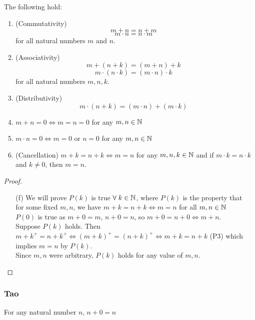\documentclass[12pt]{article}
\begin{document}
\begin{thm} \label{thm:properties}
    The following hold:
    \begin{enumerate}[label=(\alph*)]
        \item\label{thm:comm} (Commutativity)
        \[
            m + n = n + m
        \]
        \[
            m \cdot n = n \cdot m
        \]
        for all natural numbers $m$ and $n$.

        \item\label{thm:asso} (Associativity)
        \[
            m + (n + k) = (m + n) + k
        \] \[
            m \cdot (n \cdot k) = (m \cdot n) \cdot k
        \]
        for all natural numbers $m, n, k$.

        \item\label{thm:dist} (Distributivity)
        \[
            m \cdot (n + k) = (m \cdot n) + (m \cdot k)
        \]
        
        \item\label{thm:m+n=0} $m + n = 0 \iff m = n = 0$ for any $m, n \in \mathbb{N}$

        \item $m \cdot n = 0 \iff m = 0$ or $n = 0$ for any $m, n \in \mathbb{N}$

        \item (Cancellation) $m + k = n + k \iff m = n$ for any $m, n, k \in \mathbb{N}$ and if $m \cdot k = n \cdot k$ and $k \neq 0$, then $m = n$.
    \end{enumerate}
\end{thm}

\begin{proof}
    \begin{enumerate}[label=(\alph*)]
        \item[(f)] We will prove $P(k)$ is true $\forall\; k \in \mathbb{N}$, where $P(k)$ is the property that for some fixed $m, n$, we have $m + k = n + k \iff m = n$ for all $m, n \in \mathbb{N}$ \\
        $P(0)$ is true as $m + 0 = m$, $n + 0 = n$, so $m + 0 = n + 0 \iff m + n$. \\
        Suppose $P(k)$ holds. Then $m + k^{+} = n + k^{+} \iff (m + k)^{+} = (n + k)^{+} \iff m + k = n + k$ (P3) which implies $m = n$ by $P(k)$. \\
        Since $m, n$ were arbitrary, $P(k)$ holds for any value of $m, n$.
    \end{enumerate}
\end{proof}

\subsubsection{Tao}
\begin{lem} \label{lem:n+0=n}
For any natural number $n$, $n+0=n$
\end{lem}
\end{document}
